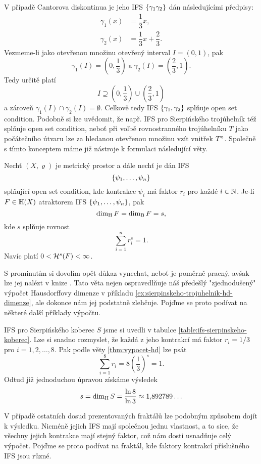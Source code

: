 V případě Cantorova diskontinua je jeho IFS $\left\{\gamma_1\gamma_2\right\}$ dán následujícími předpisy:
\begin{align*}
    \gamma_1(x)&=\dfrac{1}{3}x,\\
    \gamma_2(x)&=\dfrac{1}{3}x+\dfrac{2}{3}.
\end{align*}
Vezmeme-li jako otevřenou množinu otevřený interval $I=(0,1)$, pak
\[\gamma_1(I)=\left(0,\frac{1}{3}\right)\;\text{a}\;\gamma_2(I)=\left(\frac{2}{3},1\right).\]
Tedy určitě platí
\[I\supseteq\left(0,\frac{1}{3}\right)\cup\left(\frac{2}{3},1\right)\]
a zároveň $\gamma_1(I)\cap\gamma_2(I)=\emptyset$. Celkově tedy IFS $\left\{\gamma_1,\gamma_2\right\}$ splňuje open set condition. Podobně si lze uvědomit, že např. IFS pro Sierpińského trojúhelník též splňuje open set condition, neboť při volbě rovnostranného trojúhelníku $T$ jako počátečního útvaru lze za hledanou otevřenou množinu vzít vnitřek $T^\circ$. Společně s tímto konceptem máme již nástroje k formulaci následující věty.
\begin{theorem}\label{thm:vypocet-hd}
    Nechť $(X,\varrho)$ je metrický prostor a dále nechť je dán IFS
    \[\left\{\psi_1,\ldots,\psi_n\right\}\]
    splňující open set condition, kde kontrakce $\psi_i$ má faktor $r_i$ pro každé $i\in\mathbb{N}$. Je-li $F\in\mathbb{H}(X)$ atraktorem IFS $\left\{\psi_1,\ldots,\psi_n\right\}$, pak
    \[\operatorname{dim_H}{F}=\operatorname{dim_B}{F}=s,\]
    kde $s$ splňuje rovnost
    \[\sum_{i=1}^{n}r_i^s=1.\]
    Navíc platí $0<\mathcal{H}^{s}(F)<\infty$. 
\end{theorem}
S prominutím si dovolím opět důkaz vynechat, neboť je poměrně pracný, avšak lze jej nalézt v knize \citep[str. 140]{Falconer1989}. Tato věta nejen ospravedlňuje náš předešlý "zjednodušený" výpočet Hausdorffovy dimenze v příkladu \ref{ex:sierpinskeho-trojuhelnik-hd-dimenze}, ale dokonce nám jej podstatně zlehčuje. Pojďme se proto podívat na některé další příklady výpočtu.
\begin{example}\label{ex:sierpinskeho-koberec-hd-dimenze}
    IFS pro Sierpińského koberec $S$ jsme si uvedli v tabulce \ref{table:ifs-sierpinskeho-koberec}. Lze si snadno rozmyslet, že každá z jeho kontrakcí má faktor $r_i=1/3$ pro $i=1,2,\ldots,8$. Pak podle věty \ref{thm:vypocet-hd} lze psát
    \[\sum_{i=1}^{8}r_i=8\left(\dfrac{1}{3}\right)^s=1.\]
    Odtud již jednoduchou úpravou získáme výsledek
    \[s=\operatorname{dim_H}{S}=\dfrac{\ln{8}}{\ln{3}}\approx1{,}892789\ldots\]
\end{example}
V případě ostatních dosud prezentovaných fraktálů lze podobným způsobem dojít k výsledku. Nicméně jejich IFS mají společnou jednu vlastnost, a to sice, že všechny jejich kontrakce mají stejný faktor, což nám dosti usnadňuje celý výpočet. Pojďme se proto podívat na fraktál, kde faktory kontrakcí příslušného IFS jsou různé.
